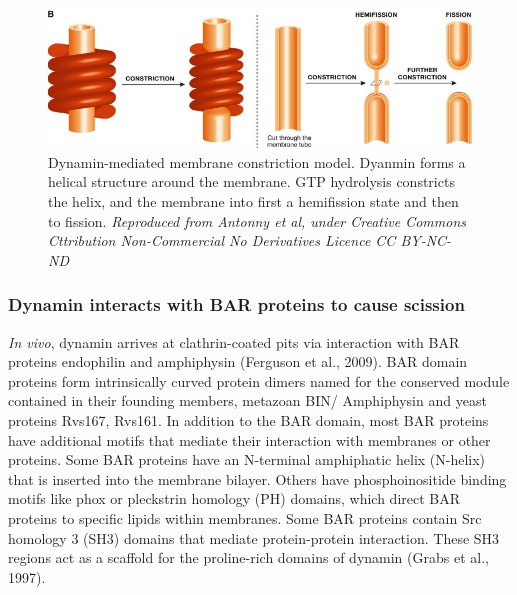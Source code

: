 		
	\begin{figure}[H]
			\centering
			\includegraphics[scale=0.5]{figures/intro/dynamin_2}
\caption[Dynamin forms a scaffold]
					{Dynamin-mediated membrane constriction model. Dyanmin forms a helical structure around the membrane. GTP hydrolysis constricts the helix, and the membrane into first a hemifission state and then to fission.
					\textit{Reproduced from Antonny et al, under Creative Commons Cttribution Non-Commercial No Derivatives Licence CC BY-NC-ND}
		\label{intro_dynamin_scission}}
		\end{figure}



		\subsubsection{Dynamin interacts with BAR proteins to cause scission}
\textit{In vivo}, dynamin arrives at clathrin-coated pits via interaction with BAR proteins endophilin and amphiphysin (Ferguson et al., 2009). BAR domain proteins form intrinsically curved protein dimers named for the conserved module contained in their founding members, metazoan BIN/ Amphiphysin and yeast proteins Rvs167, Rvs161. In addition to the BAR domain, most BAR proteins have additional motifs that mediate their interaction with membranes or other proteins. Some BAR proteins have an N-terminal amphiphatic helix (N-helix) that is inserted into the membrane bilayer.  Others have phosphoinositide binding motifs like phox or pleckstrin homology (PH) domains, which direct BAR proteins to specific lipids within membranes. Some BAR proteins contain Src homology 3 (SH3) domains that mediate protein-protein interaction. These SH3 regions act as a scaffold for the proline-rich domains of dynamin (Grabs et al., 1997). 



